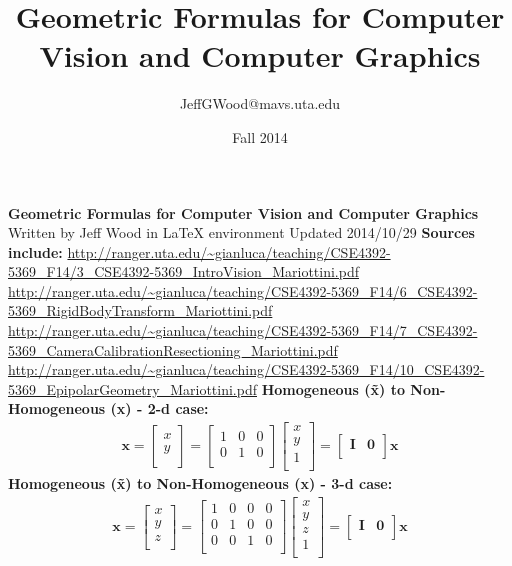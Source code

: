 \documentclass[a4paper,10pt]{article}
\title{Geometric Formulas for Computer Vision and Computer Graphics}
\author{JeffGWood@mavs.uta.edu}
\date{Fall 2014}
\newcommand{\sNHx}{\ensuremath{\textbf{x}}}
\newcommand{\sHx}{\ensuremath{\textbf{\~{x}}}}
\newcommand{\vNHxy}{\ensuremath{\left[\begin{array}{c}x\\y\\\end{array}\right]}}
\newcommand{\vHxy}{\ensuremath{\left[\begin{array}{c}x\\y\\1\\\end{array}\right]}}
\newcommand{\vNHxyz}{\ensuremath{\left[\begin{array}{c}x\\y\\z\\\end{array}\right]}}
\newcommand{\vHxyz}{\ensuremath{\left[\begin{array}{c}x\\y\\z\\1\\\end{array}\right]}}
\newcommand{\mHtoNHtwoD}{\ensuremath{\left[\begin{array}{ccc}1 & 0 & 0\\0 & 1 & 0\\\end{array}\right]}}
\newcommand{\mHtoNHthrD}{\ensuremath{\left[\begin{array}{cccc}1 & 0 & 0 & 0\\0 & 1 & 0 & 0\\0 & 0 & 1 & 0\\\end{array}\right]}}
\newcommand{\mIzero}{\ensuremath{\left[\begin{array}{cc}\textbf{I} & \textbf{0}\\\end{array}\right]}}
\begin{document}
\Huge\textbf{Geometric Formulas for \newline Computer Vision and Computer Graphics}\newline
\newline\noindent\newline\noindent
\large Written by Jeff Wood in LaTeX environment\newline
\large Updated 2014/10/29 \newline
\normalsize
\newline\noindent\newline\noindent
\textbf{Sources include:}\newline
\url{http://ranger.uta.edu/~gianluca/teaching/CSE4392-5369_F14/3_CSE4392-5369_IntroVision_Mariottini.pdf}\newline
\url{http://ranger.uta.edu/~gianluca/teaching/CSE4392-5369_F14/6_CSE4392-5369_RigidBodyTransform_Mariottini.pdf}\newline
\url{http://ranger.uta.edu/~gianluca/teaching/CSE4392-5369_F14/7_CSE4392-5369_CameraCalibrationResectioning_Mariottini.pdf}\newline
\url{http://ranger.uta.edu/~gianluca/teaching/CSE4392-5369_F14/10_CSE4392-5369_EpipolarGeometry_Mariottini.pdf}
\newline\noindent\newline\noindent
\textbf{Homogeneous (\~{x}) to Non-Homogeneous (x) - 2-d case:}
\begin{equation}
\begin{split}
\sNHx = \vNHxy=\mHtoNHtwoD \vHxy=\mIzero \sHx
\end{split}
\end{equation}
\newline\noindent\newline\noindent
\textbf{Homogeneous (\~{x}) to Non-Homogeneous (x) - 3-d case:}
\begin{equation}
\begin{split}
\sNHx =\vNHxyz=\mHtoNHthrD\vHxyz=\mIzero \sHx
\end{split}
\end{equation}
\newline
\end{document}
